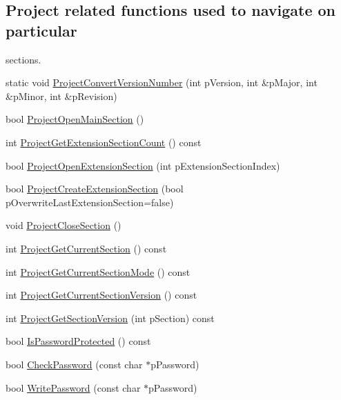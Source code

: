 \subsection*{Project related functions used to navigate on particular}
\label{_amgrp5d530e02c4b0128d67f84f3010e45d70}%
 sections. \begin{DoxyCompactItemize}
\item 
static void \hyperlink{class_fbx_i_o_aa9f00a69103d7da08583a0aee151fae7}{Project\+Convert\+Version\+Number} (int p\+Version, int \&p\+Major, int \&p\+Minor, int \&p\+Revision)
\item 
bool \hyperlink{class_fbx_i_o_aad4f715a886ebfc218f54b1387804190}{Project\+Open\+Main\+Section} ()
\item 
int \hyperlink{class_fbx_i_o_a9596d5f702a59e9fed8bf4bd6ca4152f}{Project\+Get\+Extension\+Section\+Count} () const
\item 
bool \hyperlink{class_fbx_i_o_a1ea2ed80a2aad6743adccf7cf56b4b9e}{Project\+Open\+Extension\+Section} (int p\+Extension\+Section\+Index)
\item 
bool \hyperlink{class_fbx_i_o_a664d52626a3635c5048567794b51a05f}{Project\+Create\+Extension\+Section} (bool p\+Overwrite\+Last\+Extension\+Section=false)
\item 
void \hyperlink{class_fbx_i_o_a6efa56aa583fc29ddcb2dbffe278bcc2}{Project\+Close\+Section} ()
\item 
int \hyperlink{class_fbx_i_o_ab98db88288777a2c4e6534d3fd58ecd2}{Project\+Get\+Current\+Section} () const
\item 
int \hyperlink{class_fbx_i_o_a7f79a8e25c3312c66827303b4f3d4836}{Project\+Get\+Current\+Section\+Mode} () const
\item 
int \hyperlink{class_fbx_i_o_a6785ab2f15b83908056963e342b89bd7}{Project\+Get\+Current\+Section\+Version} () const
\item 
int \hyperlink{class_fbx_i_o_ad12d55a87d312364ece336d628c6e906}{Project\+Get\+Section\+Version} (int p\+Section) const
\item 
bool \hyperlink{class_fbx_i_o_a04c60fa24b0b75d64b70e98db565d3ce}{Is\+Password\+Protected} () const
\item 
bool \hyperlink{class_fbx_i_o_aef25f0c71cf2a40239c732bc4226b69a}{Check\+Password} (const char $\ast$p\+Password)
\item 
bool \hyperlink{class_fbx_i_o_a03a20d0050af01b219fe9f726e525da9}{Write\+Password} (const char $\ast$p\+Password)
\end{DoxyCompactItemize}


